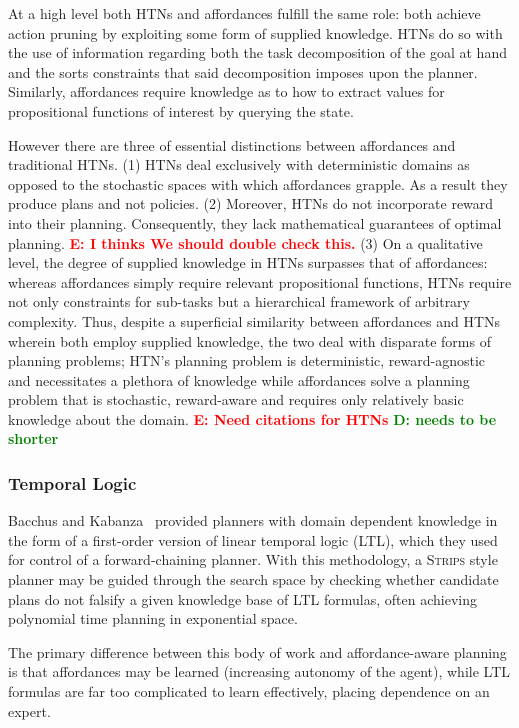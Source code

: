\documentclass[conference]{IEEEtran}
\newcommand{\dnote}[1]{\textcolor{Green}{\textbf{D: #1}}}
\newcommand{\enote}[1]{\textcolor{Red}{\textbf{E: #1}}}
\begin{document}
At a high level both HTNs and affordances fulfill the same role: both achieve action pruning by exploiting some form of supplied knowledge. HTNs do so with the use of information regarding both the task decomposition of the goal at hand and the sorts constraints that said decomposition imposes upon the planner. Similarly, affordances require knowledge as to how to extract values for propositional functions of interest by querying the state.

However there are three of essential distinctions between affordances and traditional HTNs. (1) HTNs deal exclusively with deterministic domains as opposed to the stochastic spaces with which affordances grapple. As a result they produce plans and not policies. (2) Moreover, HTNs do not incorporate reward into their planning. Consequently, they lack mathematical guarantees of optimal planning. \enote{I thinks We should double check this.} (3) On a qualitative level, the degree of supplied knowledge in HTNs surpasses that of affordances: whereas affordances simply require relevant propositional functions, HTNs require not only constraints for sub-tasks but a hierarchical framework of arbitrary complexity. Thus, despite a superficial similarity between affordances and HTNs wherein both employ supplied knowledge, the two deal with disparate forms of planning problems; HTN's planning problem is deterministic, reward-agnostic and necessitates a plethora of knowledge while affordances solve a planning problem that is stochastic, reward-aware and requires only relatively basic knowledge about the domain.
\enote{Need citations for HTNs}
\dnote{needs to be shorter}
\subsubsection{Temporal Logic}

Bacchus and Kabanza~\cite{Bacchus95usingtemporal,Bacchus99usingtemporal} provided
planners with domain dependent knowledge in the form of a first-order version of linear
temporal logic (LTL), which they used for control of a forward-chaining planner. With this methodology, 
a \textsc{Strips} style planner may be guided through the search space by checking 
whether candidate plans do not falsify a given knowledge base of LTL formulas, often
achieving polynomial time planning in exponential space.

The primary difference between this body of work and affordance-aware planning is that affordances may be learned (increasing autonomy of the agent), while LTL formulas are far too complicated to learn effectively, placing dependence on an expert.
\end{document}
